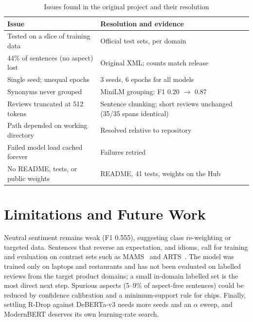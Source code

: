 \documentclass[conference]{IEEEtran}
\begin{document}
\begin{table}[t]
\caption{Issues found in the original project and their resolution}
\label{tab:review}
\centering
\footnotesize
\setlength{\tabcolsep}{3pt}
\begin{tabular}{@{}p{}p{}@{}}
\toprule
Issue & Resolution and evidence \\
\midrule
Tested on a slice of training data & Official test sets, per domain \\
44\% of sentences (no aspect) lost & Original XML; counts match release \\
Single seed; unequal epochs & 3 seeds, 6 epochs for all models \\
Synonyms never grouped & MiniLM grouping: F1 0.20 $\rightarrow$ 0.87 \\
Reviews truncated at 512 tokens & Sentence chunking; short reviews unchanged (35/35 spans identical) \\
Path depended on working directory & Resolved relative to repository \\
Failed model load cached forever & Failures retried \\
No README, tests, or public weights & README, 41 tests, weights on the Hub \\
\bottomrule
\end{tabular}
\end{table}

\section{Limitations and Future Work}
Neutral sentiment remains weak (F1 0.555), suggesting class re-weighting or targeted data. Sentences that reverse an expectation, and idioms, call for training and evaluation on contrast sets such as MAMS~\cite{jiang2019mams} and ARTS~\cite{xing2020arts}. The model was trained only on laptops and restaurants and has not been evaluated on labelled reviews from the target product domains; a small in-domain labelled set is the most direct next step. Spurious aspects (5--9\% of aspect-free sentences) could be reduced by confidence calibration and a minimum-support rule for chips. Finally, settling R-Drop against DeBERTa-v3 needs more seeds and an $\alpha$ sweep, and ModernBERT deserves its own learning-rate search.

\end{document}
